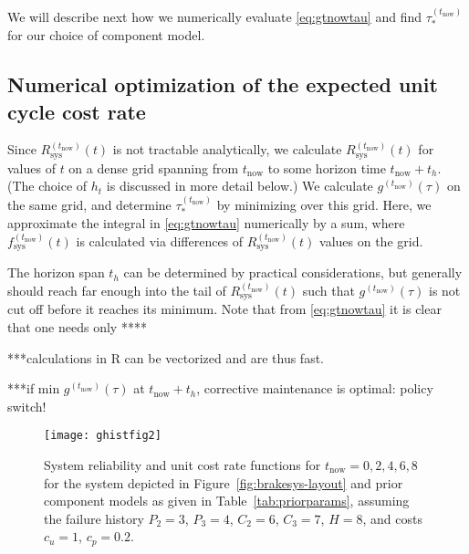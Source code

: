 \documentclass[authoryear]{elsarticle}
\def\tnow{t_\text{now}}
\newcommand{\Rsysnow}{R^{(t_\text{now})}_\text{sys}}
\newcommand{\fsysnow}{f^{(t_\text{now})}_\text{sys}}
\newcommand{\gnow}{g^{(\tnow)}}
\newcommand{\tausnow}{\tau_*^{(\tnow)}}
\begin{document}
We will describe next how we numerically evaluate \eqref{eq:gtnowtau} and find $\tausnow$
for our choice of component model.


\subsection{Numerical optimization of the expected unit cycle cost rate}
\label{sec:optim}

Since $\Rsysnow(t)$ is not tractable analytically,
we calculate $\Rsysnow(t)$ for values of $t$ on a dense grid spanning from $\tnow$ to some horizon time $\tnow + t_h$.
(The choice of $h_t$ is discussed in more detail below.)
We calculate $\gnow(\tau)$ on the same grid,
and determine $\tausnow$ by minimizing over this grid.
Here, we approximate the integral in \eqref{eq:gtnowtau} numerically by a sum,
where $\fsysnow(t)$ is calculated via differences of $\Rsysnow(t)$ values on the grid.

The horizon span $t_h$ can be determined by practical considerations,
but generally should reach far enough into the tail of $\Rsysnow(t)$
such that $\gnow(\tau)$ is not cut off before it reaches its minimum. %
Note that from \eqref{eq:gtnowtau} it is clear that one needs only ****


***calculations in \textsf{R} can be vectorized and are thus fast.

***if min $\gnow(\tau)$ at $\tnow + t_h$, corrective maintenance is optimal: policy switch!



\begin{figure}
\texttt{[image: ghistfig2]}
\caption{System reliability and unit cost rate functions for $\tnow = 0,2,4,6,8$
for the system depicted in Figure~\ref{fig:brakesys-layout}
and prior component models as given in Table~\ref{tab:priorparams},
assuming the failure history $P_2 = 3$, $P_3 = 4$, $C_2 = 6$, $C_3 = 7$, $H = 8$,
and costs $c_u = 1$, $c_p = 0.2$.}
\label{fig:ghistfig2}
\end{figure}
\end{document}
